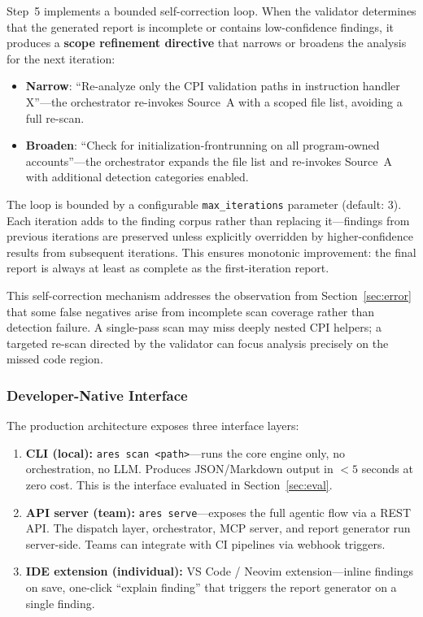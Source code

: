 \documentclass{article}
\begin{document}
Step~5 implements a bounded self-correction loop. When the validator determines that the generated report is incomplete or contains low-confidence findings, it produces a \textbf{scope refinement directive} that narrows or broadens the analysis for the next iteration:

\begin{itemize}
  \item \textbf{Narrow}: ``Re-analyze only the CPI validation paths in instruction handler X''---the orchestrator re-invokes Source~A with a scoped file list, avoiding a full re-scan.
  \item \textbf{Broaden}: ``Check for initialization-frontrunning on all program-owned accounts''---the orchestrator expands the file list and re-invokes Source~A with additional detection categories enabled.
\end{itemize}

The loop is bounded by a configurable \texttt{max\_iterations} parameter (default: 3). Each iteration adds to the finding corpus rather than replacing it---findings from previous iterations are preserved unless explicitly overridden by higher-confidence results from subsequent iterations. This ensures monotonic improvement: the final report is always at least as complete as the first-iteration report.

This self-correction mechanism addresses the observation from Section~\ref{sec:error} that some false negatives arise from incomplete scan coverage rather than detection failure. A single-pass scan may miss deeply nested CPI helpers; a targeted re-scan directed by the validator can focus analysis precisely on the missed code region.

\subsubsection{Developer-Native Interface}

The production architecture exposes three interface layers:

\begin{enumerate}
  \item \textbf{CLI (local):} \texttt{ares scan <path>}---runs the core engine only, no orchestration, no LLM. Produces JSON/Markdown output in $<5$ seconds at zero cost. This is the interface evaluated in Section~\ref{sec:eval}.
  \item \textbf{API server (team):} \texttt{ares serve}---exposes the full agentic flow via a REST API. The dispatch layer, orchestrator, MCP server, and report generator run server-side. Teams can integrate with CI pipelines via webhook triggers.
  \item \textbf{IDE extension (individual):} VS Code / Neovim extension---inline findings on save, one-click ``explain finding'' that triggers the report generator on a single finding.
\end{enumerate}
\end{document}
